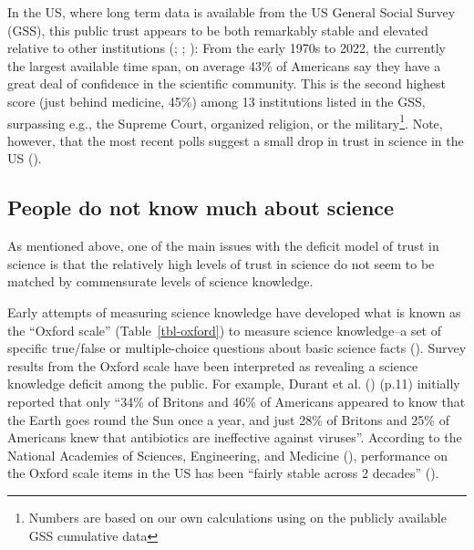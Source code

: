 \documentclass[
  jou,
  floatsintext,
  longtable,
  nolmodern,
  notxfonts,
  notimes,
  colorlinks=true,linkcolor=blue,citecolor=blue,urlcolor=blue]{apa7}
\begin{document}
In the US, where long term data is available from the US General Social
Survey (GSS), this public trust appears to be both remarkably stable and
elevated relative to other institutions
(;
; ): From the early 1970s to 2022, the currently the largest
available time span, on average 43\% of Americans say they have a great
deal of confidence in the scientific community. This is the second
highest score (just behind medicine, 45\%) among 13 institutions listed
in the GSS, surpassing e.g., the Supreme Court, organized religion, or
the military\footnote{Numbers are based on our own calculations using on
  the publicly available GSS cumulative data}. Note, however, that the
most recent polls suggest a small drop in trust in science in the US
().

\subsection{People do not know much about
science}\label{people-do-not-know-much-about-science}

As mentioned above, one of the main issues with the deficit model of
trust in science is that the relatively high levels of trust in science
do not seem to be matched by commensurate levels of science knowledge.

Early attempts of measuring science knowledge have developed what is
known as the ``Oxford scale'' (Table~\ref{tbl-oxford}) to measure
science knowledge--a set of specific true/false or multiple-choice
questions about basic science facts
(). Survey results
from the Oxford scale have been interpreted as revealing a science
knowledge deficit among the public. For example, Durant et al.
() (p.11)
initially reported that only ``34\% of Britons and 46\% of Americans
appeared to know that the Earth goes round the Sun once a year, and just
28\% of Britons and 25\% of Americans knew that antibiotics are
ineffective against viruses''. According to the National Academies of
Sciences, Engineering, and Medicine
(),
performance on the Oxford scale items in the US has been ``fairly stable
across 2 decades''
().
\end{document}
